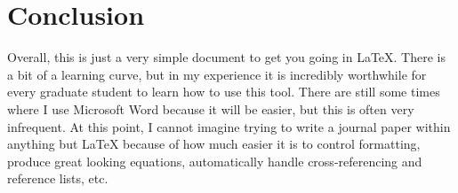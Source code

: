 \section{Conclusion}
\label{sec:conclusion}
Overall, this is just a very simple document to get you going in LaTeX. There is a bit of a learning curve, but in my experience it is incredibly worthwhile for every graduate student to learn how to use this tool. There are still some times where I use Microsoft Word because it will be easier, but this is often very infrequent. At this point, I cannot imagine trying to write a journal paper within anything but LaTeX because of how much easier it is to control formatting, produce great looking equations, automatically handle cross-referencing and reference lists, etc.